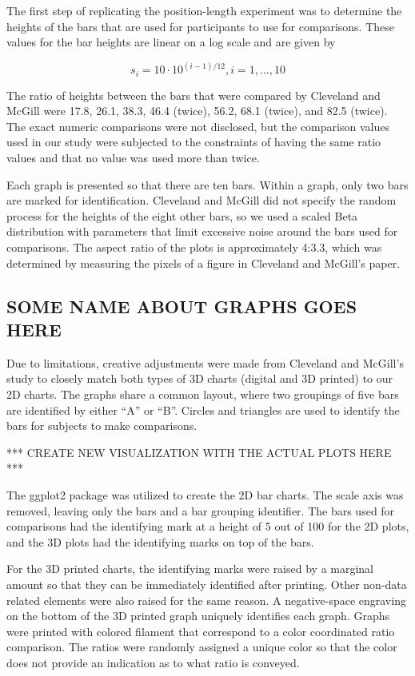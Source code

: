 \documentclass[letterpaper,inpress]{jdsart}
\begin{document}
The first step of replicating the position-length experiment was to determine the heights of the bars that are used for participants to use for comparisons.
These values for the bar heights are linear on a log scale and are given by

\[s_i=10\cdot 10^{(i-1)/12}, i=1,...,10\]

The ratio of heights between the bars that were compared by Cleveland and McGill were 17.8, 26.1, 38.3, 46.4 (twice), 56.2, 68.1 (twice), and 82.5 (twice).
The exact numeric comparisons were not disclosed, but the comparison values used in our study were subjected to the constraints of having the same ratio values and that no value was used more than twice.

Each graph is presented so that there are ten bars.
Within a graph, only two bars are marked for identification.
Cleveland and McGill did not specify the random process for the heights of the eight other bars, so we used a scaled Beta distribution with parameters that limit excessive noise around the bars used for comparisons.
The aspect ratio of the plots is approximately 4:3.3, which was determined by measuring the pixels of a figure in Cleveland and McGill's paper.

\hypertarget{some-name-about-graphs-goes-here}{%
\subsection{SOME NAME ABOUT GRAPHS GOES HERE}\label{some-name-about-graphs-goes-here}}

Due to limitations, creative adjustments were made from Cleveland and McGill's study to closely match both types of 3D charts (digital and 3D printed) to our 2D charts.
The graphs share a common layout, where two groupings of five bars are identified by either ``A'' or ``B''.
Circles and triangles are used to identify the bars for subjects to make comparisons.

*** CREATE NEW VISUALIZATION WITH THE ACTUAL PLOTS HERE ***

The ggplot2 package was utilized to create the 2D bar charts.
The scale axis was removed, leaving only the bars and a bar grouping identifier.
The bars used for comparisons had the identifying mark at a height of 5 out of 100 for the 2D plots, and the 3D plots had the identifying marks on top of the bars.

For the 3D printed charts, the identifying marks were raised by a marginal amount so that they can be immediately identified after printing.
Other non-data related elements were also raised for the same reason.
A negative-space engraving on the bottom of the 3D printed graph uniquely identifies each graph.
Graphs were printed with colored filament that correspond to a color coordinated ratio comparison.
The ratios were randomly assigned a unique color so that the color does not provide an indication as to what ratio is conveyed.
\end{document}

